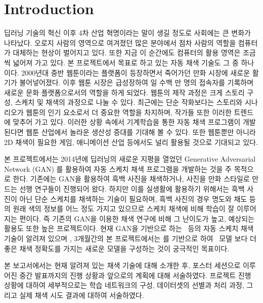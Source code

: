\section{Introduction}

딥러닝 기술의 혁신 이후 4차 산업 혁명이라는 말이 생길 정도로 사회에는 큰 변화가 나타났다. 
오로지 사람의 영역으로 여겨졌던 많은 분야에서 점차 사람의 역할을 컴퓨터가 대체하는 현상이 벌어지고 있다. 또한 지금 이 순간에도 컴퓨터의 활용 영역은 조금씩 넓어져 가고 있다. 
본 프로젝트에서 목표로 하고 있는 자동 채색 기술도 그 중 하나이다. 
2000년대 중반 웹툰이라는 플랫폼이 등장하면서 죽어가던 만화 시장에 새로운 활기가 불어넣어졌다. 
이후 웹툰 시장은 급성장하여 일 수백 만 명의 접속자를 기록하며 새로운 문화 플랫폼으로서의 역할을 하게 되었다. 
웹툰의 제작 과정은 크게 스토리 구성, 스케치 및 채색의 과정으로 나눌 수 있다.
최근에는 단순 작화보다는 스토리와 시나리오가 웹툰의 인기 요소로서 더 중요한 역할을 차지하며, 작가들 또한 이러한 트렌드에 맞추어 가고 있다.
이러한 상황 속에서 기계학습을 통한 자동 채색 프로그램이 개발된다면 웹툰 산업에서 놀라운 생산성 증대를 기대해 볼 수 있다. 
또한 웹툰뿐만 아니라 2D 채색이 필요한 게임, 애니메이션 산업 등에서도 널리 활용될 것으로 기대되고 있다.

본 프로젝트에서는 2014년에 딥러닝의 새로운 지평을 열었던 Generative Adversarial Network (GAN) \cite{Goodfellow2014} 를 활용하여 자동 스케치 채색 프로그램을 개발하는 것을 주 목적으로 한다. 
기존에는 GAN을 활용하여 흑백 사진을 채색하거나, 사진을 만화 스타일로 만드는 선행 연구들이 진행되어 왔다.
하지만 이를 실생활에 활용하기 위해서는 흑백 사진이 아닌 단순 스케치를 채색하는 기술이 필요하며, 흑백 사진의 경우 명도와 채도 등의 원래 색의 정보를 어느 정도 가지고 있으므로 스케치 채색에 비해 학습이 잘 이루어지는 편이다. 
즉 기존의 GAN을 이용한 채색 연구에 비해 그 난이도가 높고, 예상되는 활용도 또한 높은 프로젝트이다. 
현재 GAN을 기반으로 하는 \stylepaint~등의 자동 스케치 채색 기술이 알려져 있으며 \cite{Zhang2017}, 3개월간의 본 프로젝트에서는 \stylepaint 를 기반으로 하여 \autopaint~모델 \cite{Liu2018AutoPainter}보다 더 좋은 채색 정확도를 가지는 새로운 모델을 구성하는 것이 궁극적인 목표이다.

본 보고서에서는 현재 알려져 있는 채색 기술에 대해 소개한 후, 포스터 세션으로 이루어진 중간 발표까지의 진행 상황과 앞으로의 계획에 대해 서술하였다. 프로젝트 진행 상황에 대하여 세부적으로는 학습 네트워크의 구성, 데이터셋의 선별과 처리 과정, 그리고 실제 채색 시도 결과에 대하여 서술하였다.
